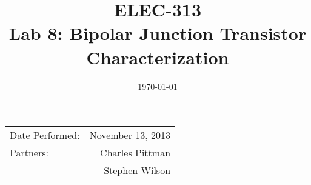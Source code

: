 \documentclass{article}
\author{}
\title{ELEC-313 \\ Lab 8: Bipolar Junction Transistor Characterization\\ }
\date{\today}
\begin{document}
\maketitle

\begin{center}
  \begin{tabular}{lr}
    Date Performed: & November 13, 2013 \\
    Partners:       & Charles Pittman    \\
    & Stephen Wilson     \\
  \end{tabular}
\end{center}

\newpage

\tableofcontents
\listoffigures
\listoftables
\newpage

\end{document}
